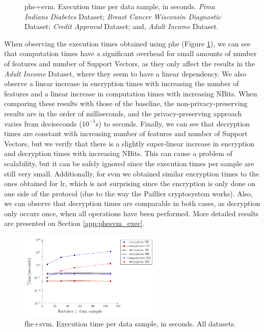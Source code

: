 \begin{figure}[b!]
\vspace*{-0.2cm}
\caption[\acs{phe}+\acs{svm}. Execution time per data sample, in seconds. All datasets.]{\acs{phe}+\acs{svm}. Execution time per data sample, in seconds.
 \emph{Pima Indians Diabetes} Dataset;
 \emph{Breast Cancer Wisconsin Diagnostic} Dataset;
 \emph{Credit Approval} Dataset; and,
 \emph{Adult Income} Dataset.}%
\label{fig:svm-phe}%
\vspace*{-0.3cm}
\end{figure}

When observing the execution times obtained using \ac{phe} (Figure \ref{fig:svm-phe}), we can see that computation times have a significant overhead for small amounts of number of features and number of Support Vectors, as they only affect the results in the \emph{Adult Income} Dataset, where they seem to have a linear dependency. 
We also observe a linear increase in encryption times with increasing the number of features and a linear increase in computation times with increasing NBits. When comparing these results with those of the baseline, the non-privacy-preserving results are in the order of milliseconds, and the privacy-preserving approach varies from deciseconds ($10^{-1}$s) to seconds.
Finally, we can see that decryption times are constant with increasing number of features and number of Support Vectors, but we verify that there is a slightly super-linear increase in encryption and decryption times with increasing NBits. This can cause a problem of scalability, but it can be safely ignored since the execution times per sample are still very small.
Additionally, for \ac{svm} we obtained similar encryption times to the ones obtained for \ac{lr}, which is not surprising since the encryption is only done on one side of the protocol (due to the way the Paillier cryptosystem works). Also, we can observe that decryption times are comparable in both cases, as decryption only occurs once, when all operations have been performed.
More detailed results are presented on Section \ref{app:phesvm_exec}.



\begin{figure}[b!]
\centering
\includegraphics[width=0.60\textwidth]{images/graphs/svm_fhe.pdf}
\caption{\acs{fhe}+\acs{svm}. Execution time per data sample, in seconds. All datasets.}
\label{fig:svm-fhe}
\end{figure}

